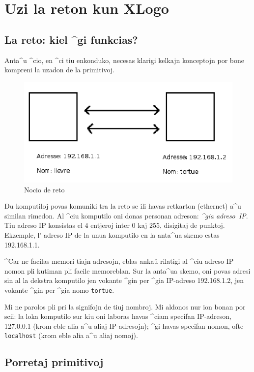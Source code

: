 \section{Uzi la reton kun XLogo}
\label{reseau}

\subsection{La reto: kiel ^gi funkcias?}

Anta^u ^cio, en ^ci tiu enkonduko, necesas klarigi kelkajn konceptojn
por bone kompreni la uzadon de la primitivoj.

\begin{figure}[h]
\includegraphics{bildoj/reseau.png}
\caption{Nocio de reto}
\end{figure}

Du komputiloj povas komuniki tra la reto se ili havas retkarton
(ethernet) a^u similan rimedon.  Al ^ciu komputilo oni donas personan
adreson: \textit{^gia adreso~IP}.  Tiu adreso IP konsistas el $4$
entjeroj inter $0$ kaj $255$, disigitaj de punktoj.  Ekzemple, l'
adreso IP de la unua komputilo en la anta^ua skemo estas 192.168.1.1.

^Car ne facilas memori tiajn adresojn, eblas ankaŭ rilatigi al ^ciu
adreso IP nomon pli kutiman pli facile memoreblan.  Sur la anta^ua
skemo, oni povas adresi sin al la dekstra komputilo jen vokante ^gin
per ^gia IP-adreso 192.168.1.2, jen vokante ^gin per ^gia nomo
\texttt{tortue}.

Mi ne parolos pli pri la signifojn de tiuj nombroj.  Mi aldonos nur
ion bonan por scii: la loka komputilo sur kiu oni laboras havas ^ciam
specifan IP-adreson, 127.0.0.1 (krom eble alia a^u aliaj IP-adresojn);
^gi havas specifan nomon, ofte \texttt{localhost} (krom eble alia a^u
aliaj nomoj).

\subsection{Porretaj primitivoj} 

